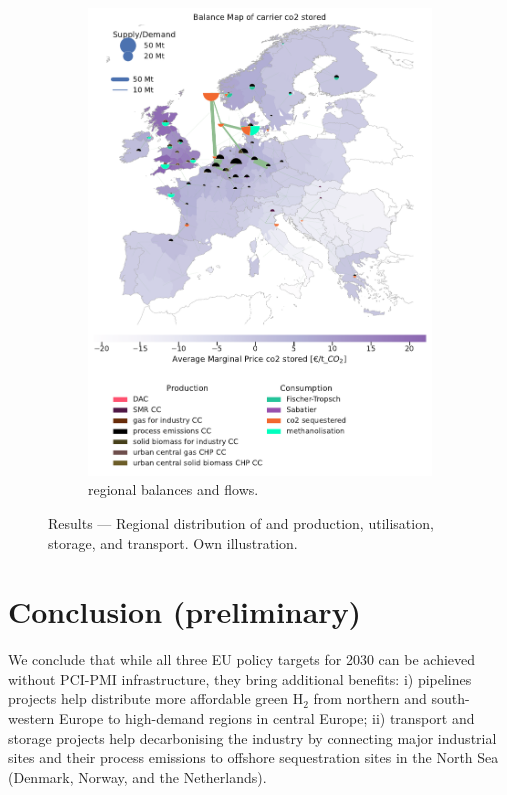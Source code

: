 \documentclass[10pt]{article}
\begin{document}
\begin{figure}[h!]
\begin{subfigure}[t]{0.495\textwidth}
        \includegraphics[width=\textwidth]{balance_map_co2} %
        \caption{ regional balances and flows.}
        \label{fig:balance_map_co2}
    \end{subfigure}
    \caption{Results --- Regional distribution of  and  production, utilisation, storage, and transport. Own illustration.}
    \label{fig:balance_maps}
\end{figure}

\newpage
\section*{Conclusion (preliminary)}
We conclude that while all three EU policy targets for 2030 can be achieved without PCI-PMI infrastructure, they bring additional benefits: i)  pipelines projects help distribute more affordable green H$_2$ from northern and south-western Europe to high-demand regions in central Europe; ii)  transport and storage projects help decarbonising the industry by connecting major industrial sites and their process emissions to offshore sequestration sites in the North Sea (Denmark, Norway, and the Netherlands).
\end{document}
